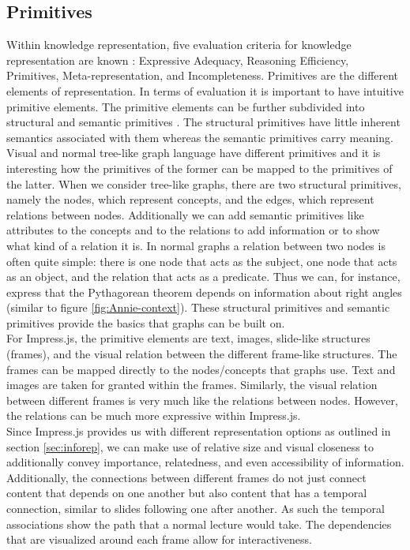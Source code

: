 \documentclass[twoside, 12pt]{article}
\begin{document}
\subsection{Primitives}
\label{sec:primitives}

Within knowledge representation, five evaluation criteria for knowledge representation are known \cite{Kohlhase:Complog:base}: Expressive Adequacy, Reasoning Efficiency, Primitives, Meta-representation, and Incompleteness. Primitives are the different elements of representation. In terms of evaluation it is important to have intuitive primitive elements. The primitive elements can be further subdivided into structural and semantic primitives \cite{DBLP:dblp_conf/acl/Salveter80}. The structural primitives have little inherent semantics associated with them whereas the semantic primitives carry meaning.\\

Visual and normal tree-like graph language have different primitives and it is interesting how the primitives of the former can be mapped to the primitives of the latter. When we consider tree-like graphs, there are two structural primitives, namely the nodes, which represent concepts, and the edges, which represent relations between nodes. Additionally we can add semantic primitives like attributes to the concepts and to the relations to add information or to show what kind of a relation it is. In normal graphs a relation between two nodes is often quite simple: there is one node that acts as the subject, one node that acts as an object, and the relation that acts as a predicate. Thus we can, for instance, express that the Pythagorean theorem depends on information about right angles (similar to figure \ref{fig:Annie-context}). These structural primitives and semantic primitives provide the basics that graphs can be built on.\\

For Impress.js, the primitive elements are text, images, slide-like structures (frames), and the visual relation between the different frame-like structures. The frames can be mapped directly to the nodes/concepts that graphs use. Text and images are taken for granted within the frames. Similarly, the visual relation between different frames is very much like the relations between nodes. However, the relations can be much more expressive within Impress.js.\\

Since Impress.js provides us with different representation options as outlined in section \ref{sec:inforep}, we can make use of relative size and visual closeness to additionally convey importance, relatedness, and even accessibility of information. Additionally, the connections between different frames do not just connect content that depends on one another but also content that has a temporal connection, similar to slides following one after another. As such the temporal associations show the path that a normal lecture would take. The dependencies that are visualized around each frame allow for interactiveness.\\
\end{document}
